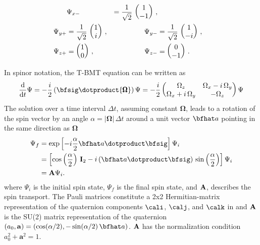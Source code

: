 {\begin{align}
  &\Psi_{x-} &= \frac{1}{\sqrt{2}} \, \begin{pmatrix} 1 \\ -1 \end{pmatrix} \, , \nonumber \\
   \Psi_{y+} &= \frac{1}{\sqrt{2}} \, \begin{pmatrix} 1 \\ i \end{pmatrix} \, , 
  &\Psi_{y-} &= \frac{1}{\sqrt{2}} \, \begin{pmatrix} 1 \\ -i \end{pmatrix} \, , \\
   \Psi_{z+} &=                       \begin{pmatrix} 1 \\ 0 \end{pmatrix} \, , 
  &\Psi_{z-} &=                       \begin{pmatrix} 0 \\ -1 \end{pmatrix} \, . \nonumber
\end{align}

In spinor notation, the T-BMT equation can be written as
  \begin{equation}   
    \frac{\mathrm{d}}{\mathrm{d} t} \Psi = - \frac{i}{2} \left( \bfsig \dotproduct   
    {\pmb\Omega} \right) \Psi = -\frac{i}{2} \begin{pmatrix}
    \Omega_z & \Omega_x - i \, \Omega_y \\
    \Omega_x + i \, \Omega_y & -\Omega_z \end{pmatrix}
    \Psi
  \end{equation}
The solution over a time interval $\Delta t$, assuming constant $\pmb\Omega$, leads to a rotation of
the spin vector by an angle $\alpha = |\pmb\Omega| \, \Delta t$ around a unit vector $\bfhat a$
pointing in the same direction as $\pmb\Omega$
  \begin{align}   
    \Psi_f &= \exp \left[ -i \frac{\alpha}{2} \bfhat a \dotproduct \bfsig \right] \Psi_i \CRNO
         &= \left[ \cos \left( \frac{\alpha}{2} \right) \, \Bf I_{2} - 
            i \, (\bfhat a \dotproduct \bfsig) \, \sin \left( \frac{\alpha}{2} \right) \right] \Psi_i \\
         &= \Bf A \Psi_i. \nonumber
  \end{align}   
where $\Psi_i$ is the initial spin state, $\Psi_f$ is the final spin state, and ${\bf A}$, describes
the spin transport. The Pauli matrices constitute a 2x2 Hermitian-matrix representation of the
quaternion components $\cali$, $\calj$, and $\calk$ in  and ${\bf A}$ is the SU(2) matrix
representation of the quaternion $(a_0, \Bf a) = (\cos(\alpha/2), -\sin(\alpha/2) \, \bfhat
a)$. ${\bf A}$ has the normalization condition $a_{0}^{2} + \boldsymbol{a}^{2} = 1$.

}
